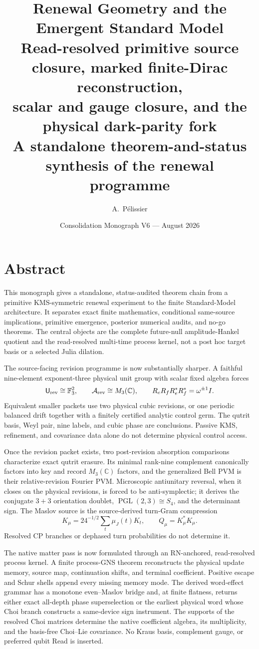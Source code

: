 \documentclass[11pt,oneside,openany]{book}
\title{\Huge\textbf{Renewal Geometry and the Emergent Standard Model}\\[3mm]
\Large Read-resolved primitive source closure, marked finite-Dirac reconstruction,\\
scalar and gauge closure, and the physical dark-parity fork\\[4mm]
\large A standalone theorem-and-status synthesis of the renewal programme}
\author{A.~P\'elissier}
\date{Consolidation Monograph V6 --- August 2026}
\numberwithin{equation}{chapter}
\theoremstyle{definition}
\theoremstyle{remark}
\newcommand{\C}{\mathbb C}
\newcommand{\Fthree}{\mathbb F_3}
\begin{document}
\hypersetup{pageanchor=false}
\maketitle
\hypersetup{pageanchor=true}
\frontmatter

\chapter*{Abstract}
This monograph gives a standalone, status-audited theorem chain from a
primitive KMS-symmetric renewal experiment to the finite Standard-Model
architecture.  It separates exact finite mathematics, conditional same-source
implications, primitive emergence, posterior numerical audits, and no-go
theorems.  The central objects are the complete future-null amplitude-Hankel
quotient and the read-resolved multi-time process kernel, not a post hoc target
basis or a selected Julia dilation.

The source-facing revision programme is now substantially sharper.  A faithful
nine-element exponent-three physical unit group with scalar fixed algebra
forces
\[
 \mathsf U_{\rm rev}\cong\Fthree^2,
 \qquad \mathcal A_{\rm rev}\cong M_3(\C),
 \qquad R_eR_fR_e^*R_f^*=\omega^{\pm1}I.
\]
Equivalent smaller packets use two physical cubic revisions, or one periodic
balanced drift together with a finitely certified analytic control germ.  The
qutrit basis, Weyl pair, nine labels, and cubic phase are conclusions.  Passive
KMS, refinement, and covariance data alone do not determine physical control
access.

Once the revision packet exists, two post-revision absorption comparisons
characterize exact qutrit erasure.  Its minimal rank-nine complement
canonically factors into key and record \(M_3(\C)\) factors, and the generalized
Bell PVM is their relative-revision Fourier PVM.  Microscopic antiunitary
reversal, when it closes on the physical revisions, is forced to be
anti-symplectic; it derives the conjugate \(3+3\) orientation doublet,
\(\operatorname{PGL}(2,3)\cong S_4\), and the determinant sign.  The Maslov source is the
source-derived turn-Gram compression
\[
 K_\mu=24^{-1/2}\sum_t\mu_J(t)K_t,
 \qquad Q_\mu=K_\mu^*K_\mu.
\]
Resolved CP branches or dephased turn probabilities do not determine it.

The native matter pass is now formulated through an RN-anchored,
read-resolved process kernel.  A finite process-GNS theorem reconstructs the
physical update memory, source map, continuation shifts, and terminal
coefficient.  Positive escape and Schur shells append every missing memory
mode.  The derived word-effect grammar has a monotone even--Maslov bridge and,
at finite flatness, returns either exact all-depth phase superselection or the
earliest physical word whose Choi branch constructs a same-device sign
instrument.  The supports of the resolved Choi matrices determine the native
coefficient algebra, its multiplicity, and the basis-free Choi--Lie covariance.
No Kraus basis, complement gauge, or preferred qubit Read is inserted.
\end{document}
